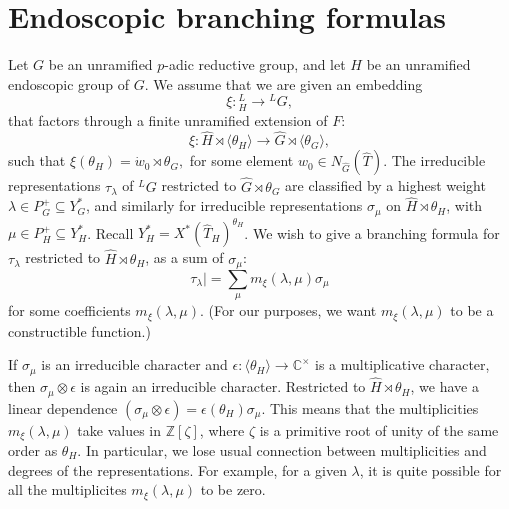 
% 
% 


\newcommand{\XX}[1]{{\it  [To do: #1]}}
\newcommand{\ring}[1]{\mathbb{#1}}
\newcommand{\g}[1]{\langle{#1}\rangle}
\def\op#1{{\operatorname{#1}}}
\def\inv{\op{inv}}
\def\dom{P^+}
\def\Q{{\ring{Q}}}
\def\card{\op{card}}
\def\CSrho{[W_S\backslash C_\rho]}

\def\C{\mathcal C}
\def\N{\mathcal N}
\def\H{\mathcal H}
\def\M{\mathcal M}
\def\T{\mathcal T}

\def\n{{\mathfrak n}}


\def\libel#1{{\text{\sc [#1]~}}\label{#1}}
\def\rif#1{(\ref{#1}-{\text{\sc #1})}}



\newpage
\section{Endoscopic branching formulas}

Let $G$ be an unramified $p$-adic reductive group, and let $H$ be an unramified endoscopic
group of $G$.  We assume that we are given an embedding
\[
\xi:{}^L_H\to {}^LG,
\]
that factors through a finite unramified extension of $F$:
\[
\xi:\hat H\rtimes \g{\theta_H}\to \hat G\rtimes \g{\theta_G},
\]
such that $\xi(\theta_H) = \dot w_0 \rtimes \theta_G,$
for some element $w_0\in N_{\hat G}(\hat T)$.
The irreducible representations $\tau_\lambda$ of ${}^LG$ restricted to $\hat G\rtimes\theta_G$ are classified
by a highest weight $\lambda\in P^+_G\subseteq Y^*_G$, and similarly for irreducible representations $\sigma_\mu$
on $\hat H\rtimes \theta_H$, with $\mu\in P^+_H\subseteq Y^*_H$.  Recall $Y^*_H = X^*(\hat T_H)^{\theta_H}$.
We wish to give a  branching formula for $\tau_\lambda$ restricted to $\hat H\rtimes\theta_H$,
as a sum of $\sigma_\mu$:
\[
\tau_\lambda| = \sum_\mu m_\xi(\lambda,\mu) \sigma_\mu
\]
for some coefficients $m_\xi(\lambda,\mu)$.  (For our purposes, we want $m_\xi(\lambda,\mu)$ to be
a constructible function.)

If $\sigma_\mu$ is an irreducible character and $\epsilon:\g{\theta_H}\to \ring{C}^\times$ is a multiplicative character,
then $\sigma_\mu\otimes \epsilon$ is again an irreducible character.  Restricted to $\hat H\rtimes\theta_H$, we have
a linear dependence $(\sigma_\mu\otimes\epsilon) = \epsilon(\theta_H) \sigma_\mu $.
This means that the multiplicities $m_\xi(\lambda,\mu)$ take values in $\ring{Z}[\zeta]$, where $\zeta$ is a primitive
root of unity of the same order as $\theta_H$.  In particular, 
we lose usual connection between multiplicities and degrees of the representations. For example,
for a given $\lambda$,
it is quite possible for all the multiplicites $m_\xi(\lambda,\mu)$ to be zero.

